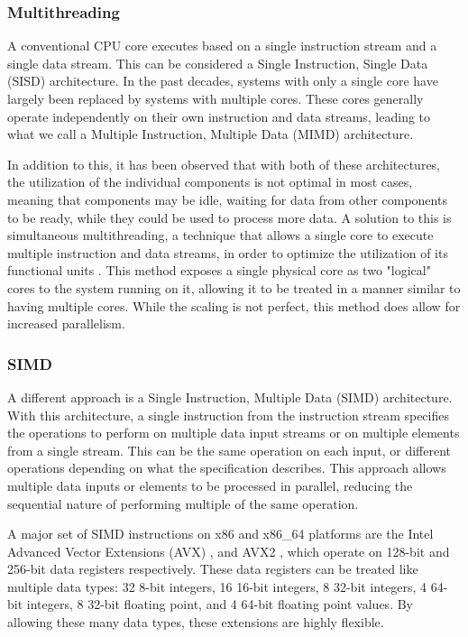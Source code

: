 \documentclass[11pt,dvipsnames]{article}
\begin{document}
\subsubsection{Multithreading}
A conventional CPU core executes based on a single instruction stream and a single data stream. This can be considered a Single Instruction, Single Data (SISD) architecture. In the past decades, systems with only a single core have largely been replaced by systems with multiple cores. These cores generally operate independently on their own instruction and data streams, leading to what we call a Multiple Instruction, Multiple Data (MIMD) architecture.

In addition to this, it has been observed that with both of these architectures, the utilization of the individual components is not optimal in most cases, meaning that components may be idle, waiting for data from other components to be ready, while they could be used to process more data. A solution to this is simultaneous multithreading, a technique that allows a single core to execute multiple instruction and data streams, in order to optimize the utilization of its functional units \cite{smt}. This method exposes a single physical core as two "logical" cores to the system running on it, allowing it to be treated in a manner similar to having multiple cores. While the scaling is not perfect, this method does allow for increased parallelism.

\clearpage

\subsubsection{SIMD}
A different approach is a Single Instruction, Multiple Data (SIMD) architecture. With this architecture, a single instruction from the instruction stream specifies the operations to perform on multiple data input streams or on multiple elements from a single stream. This can be the same operation on each input, or different operations depending on what the specification describes. This approach allows multiple data inputs or elements to be processed in parallel, reducing the sequential nature of performing multiple of the same operation.

A major set of SIMD instructions on x86 and x86\_64 platforms are the Intel Advanced Vector Extensions (AVX) \cite{Lomont11introductionto}, and AVX2 \cite{haswell}, which operate on 128-bit and 256-bit data registers respectively. These data registers can be treated like multiple data types: 32 8-bit integers, 16 16-bit integers, 8 32-bit integers, 4 64-bit integers, 8 32-bit floating point, and 4 64-bit floating point values. By allowing these many data types, these extensions are highly flexible.
\end{document}
